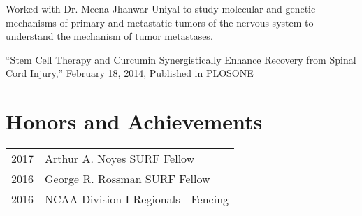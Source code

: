 \documentclass[letterpaper]{deedy-resume} %
\begin{document}
\begin{minipage}[t]{0.58\textwidth}
\sectionspace


\begin{tightitemize}
\item Worked with Dr. Meena Jhanwar-Uniyal to study molecular and genetic mechanisms of primary and metastatic tumors of the nervous system to understand the mechanism of tumor metastases.
\item ``Stem Cell Therapy and Curcumin Synergistically Enhance Recovery from Spinal Cord Injury,'' February 18, 2014, Published in PLOSONE
\end{tightitemize}

\sectionspace %



\section{Honors and Achievements} 

\begin{tabular}{rl}
	2017	 & Arthur A. Noyes SURF Fellow \\
	2016	 & George R. Rossman SURF Fellow  \\
	2016	 & NCAA Division I Regionals - Fencing\\
\end{tabular}





\end{minipage}
\end{document}
